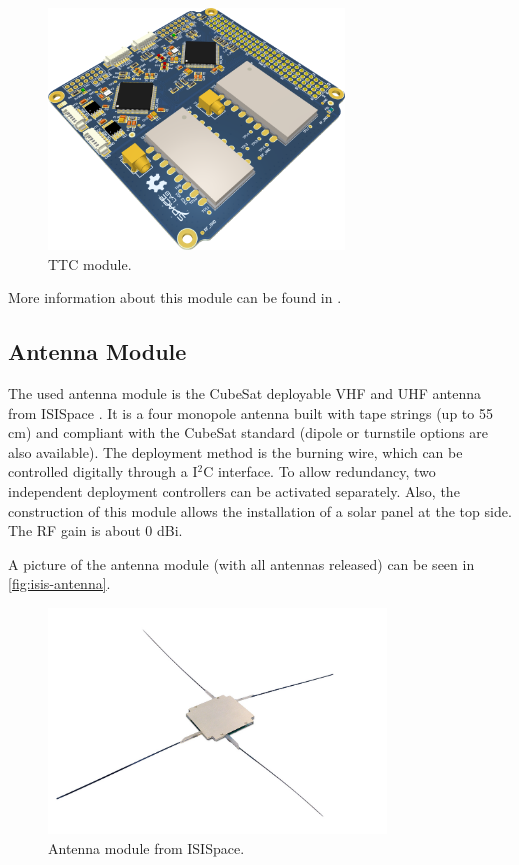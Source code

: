 \begin{figure}[!ht]
    \begin{center}
        \includegraphics[width=0.7\textwidth]{figures/ttc2_pcb_3d}
        \caption{TTC module.}
        \label{fig:ttc}
    \end{center}
\end{figure}

More information about this module can be found in \cite{ttc}.

\subsection{Antenna Module}

The used antenna module is the CubeSat deployable VHF and UHF antenna from ISISpace \cite{isis-antenna}. It is a four monopole antenna built with tape strings (up to 55 cm) and compliant with the CubeSat standard (dipole or turnstile options are also available). The deployment method is the burning wire, which can be controlled digitally through a I$^{2}$C interface. To allow redundancy, two independent deployment controllers can be activated separately. Also, the construction of this module allows the installation of a solar panel at the top side. The RF gain is about 0 dBi.

A picture of the antenna module (with all antennas released) can be seen in \autoref{fig:isis-antenna}.

\begin{figure}[!ht]
    \begin{center}
        \includegraphics[width=0.8\textwidth]{figures/isis-antenna}
        \caption{Antenna module from ISISpace.}
        \label{fig:isis-antenna}
    \end{center}
\end{figure}

